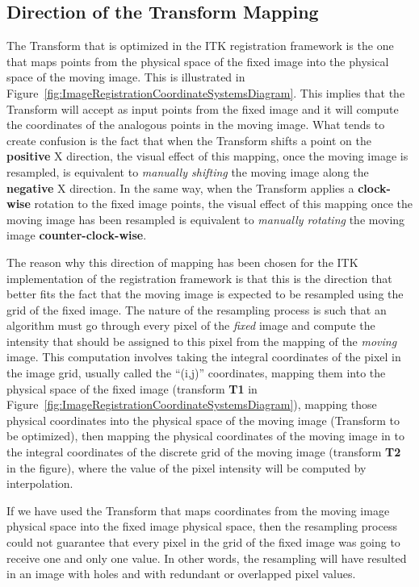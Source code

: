 \subsection{Direction of the Transform Mapping}
\label{sec:DirectionOfTheTransformMapping}

The Transform that is optimized in the ITK registration framework is the one
that maps points from the physical space of the fixed image into the physical
space of the moving image. This is illustrated in
Figure~\ref{fig:ImageRegistrationCoordinateSystemsDiagram}. This implies that
the Transform will accept as input points from the fixed image and it will
compute the coordinates of the analogous points in the moving image. What tends
to create confusion is the fact that when the Transform shifts a point on the
\textbf{positive} X direction, the visual effect of this mapping, once the
moving image is resampled, is equivalent to {\em manually shifting} the moving
image along the \textbf{negative} X direction. In the same way, when the
Transform applies a \textbf{clock-wise} rotation to the fixed image points, the
visual effect of this mapping once the moving image has been resampled is
equivalent to {\em manually rotating} the moving image
\textbf{counter-clock-wise}.

The reason why this direction of mapping has been chosen for the ITK
implementation of the registration framework is that this is the direction that
better fits the fact that the moving image is expected to be resampled using
the grid of the fixed image. The nature of the resampling process is such that
an algorithm must go through every pixel of the {\em fixed} image and compute
the intensity that should be assigned to this pixel from the mapping of the
{\em moving} image. This computation involves taking the integral coordinates
of the pixel in the image grid, usually called the ``(i,j)'' coordinates,
mapping them into the physical space of the fixed image (transform \textbf{T1}
in Figure~\ref{fig:ImageRegistrationCoordinateSystemsDiagram}), mapping those
physical coordinates into the physical space of the moving image (Transform to
be optimized), then mapping the physical coordinates of the moving image in to
the integral coordinates of the discrete grid of the moving image (transform
\textbf{T2} in the figure), where the value of the pixel intensity will be
computed by interpolation.

If we have used the Transform that maps coordinates from the moving image
physical space into the fixed image physical space, then the resampling process
could not guarantee that every pixel in the grid of the fixed image was going
to receive one and only one value. In other words, the resampling will have
resulted in an image with holes and with redundant or overlapped pixel values.

